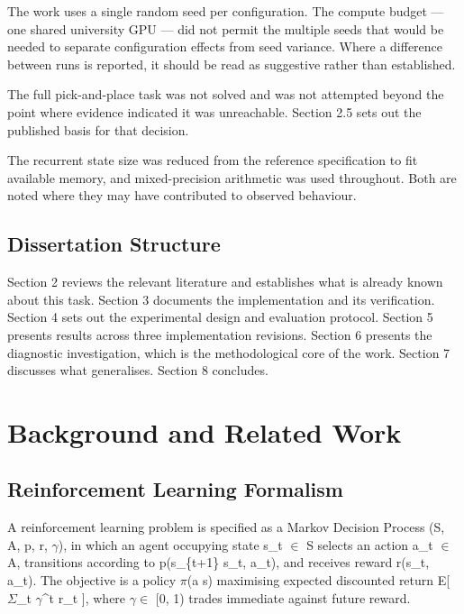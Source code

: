 \documentclass[12pt,a4paper,oneside]{report}
\begin{document}
The work uses a single random seed per configuration. The compute budget --- one
shared university GPU --- did not permit the multiple seeds that would be needed
to separate configuration effects from seed variance. Where a difference between
runs is reported, it should be read as suggestive rather than established.

The full pick-and-place task was not solved and was not attempted beyond the
point where evidence indicated it was unreachable. Section 2.5 sets out the
published basis for that decision.

The recurrent state size was reduced from the reference specification to fit
available memory, and mixed-precision arithmetic was used throughout. Both are
noted where they may have contributed to observed behaviour.

\hypertarget{dissertation-structure}{%
\section{Dissertation Structure}\label{dissertation-structure}}

Section 2 reviews the relevant literature and establishes what is already known
about this task. Section 3 documents the implementation and its verification.
Section 4 sets out the experimental design and evaluation protocol. Section 5
presents results across three implementation revisions. Section 6 presents the
diagnostic investigation, which is the methodological core of the work. Section
7 discusses what generalises. Section 8 concludes.

\newpage

\hypertarget{background-and-related-work}{%
\chapter{Background and Related Work}\label{background-and-related-work}}

\hypertarget{reinforcement-learning-formalism}{%
\section{Reinforcement Learning Formalism}\label{reinforcement-learning-formalism}}

A reinforcement learning problem is specified as a Markov Decision Process
(S, A, p, r, $\gamma$), in which an agent occupying state
s\_t $\in$ S selects an action a\_t $\in$ A, transitions
according to p(s\_\{t+1\} \textbar{} s\_t, a\_t), and receives reward
r(s\_t, a\_t). The objective is a policy $\pi$(a \textbar{} s) maximising expected
discounted return E{[} $\Sigma$\_t $\gamma$\^{}t r\_t {]}, where
$\gamma \in$ {[}0, 1) trades immediate against future reward.
\end{document}

